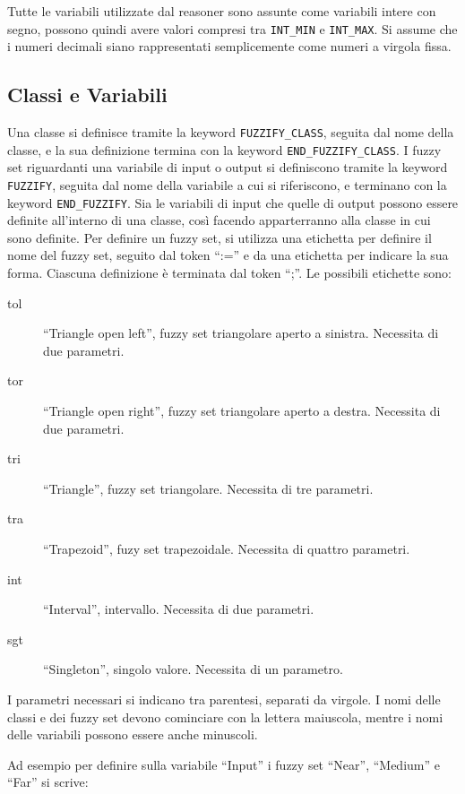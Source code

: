 Tutte le variabili utilizzate dal reasoner sono assunte come variabili intere con segno, possono quindi avere valori compresi tra \verb|INT_MIN| e \verb|INT_MAX|.
Si assume che i numeri decimali siano rappresentati semplicemente come numeri a virgola fissa.


\subsection{Classi e Variabili}
Una classe si definisce tramite la keyword \verb|FUZZIFY_CLASS|, seguita dal nome della classe, e la sua definizione termina con la keyword \verb|END_FUZZIFY_CLASS|.
I fuzzy set riguardanti una variabile di input o output si definiscono tramite la keyword \verb|FUZZIFY|, seguita dal nome della variabile a cui si riferiscono, e terminano con la keyword \verb|END_FUZZIFY|.
Sia le variabili di input che quelle di output possono essere definite all'interno di una classe, così facendo apparterranno alla classe in cui sono definite.
Per definire un fuzzy set, si utilizza una etichetta per definire il nome del fuzzy set, seguito dal token ``:='' e da una etichetta per indicare la sua forma. Ciascuna definizione è terminata dal token ``;''. Le possibili etichette sono:

\begin{description}
 \item [tol] ``Triangle open left'', fuzzy set triangolare aperto a sinistra. Necessita di due parametri.
 \item [tor] ``Triangle open right'', fuzzy set triangolare aperto a destra. Necessita di due parametri.
 \item [tri] ``Triangle'', fuzzy set triangolare. Necessita di tre parametri.
 \item [tra] ``Trapezoid'', fuzy set trapezoidale. Necessita di quattro parametri.
 \item [int] ``Interval'', intervallo. Necessita di due parametri.
 \item [sgt] ``Singleton'', singolo valore. Necessita di un parametro.
\end{description}

I parametri necessari si indicano tra parentesi, separati da virgole.
I nomi delle classi e dei fuzzy set devono cominciare con la lettera maiuscola, mentre i nomi delle variabili possono essere anche minuscoli.


Ad esempio per definire sulla variabile ``Input'' i fuzzy set ``Near'', ``Medium'' e ``Far'' si scrive:

